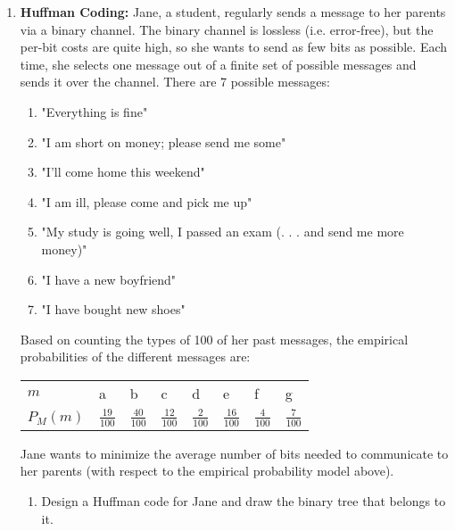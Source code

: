 \documentclass[pdftex,12pt,a4paper]{article}
\begin{document}
\begin{enumerate}
    \newpage
    \item \textbf{Huffman Coding:} Jane, a student, regularly sends a message
        to her parents via a binary channel. The binary channel is lossless
        (i.e.  error-free), but the per-bit costs are quite high, so she wants
        to send as few bits as possible. Each time, she selects one message out
        of a finite set of possible messages and sends it over the channel. 
        There are 7 possible messages:
        \begin{enumerate}
            \item "Everything is fine"
            \item "I am short on money; please send me some"
            \item "I'll come home this weekend"
            \item "I am ill, please come and pick me up"
            \item "My study is going well, I passed an exam (. . . and send me more money)"
            \item "I have a new boyfriend"
            \item "I have bought new shoes"
        \end{enumerate}
        Based on counting the types of 100 of her past messages, the empirical
        probabilities of the different messages are:
        \begin{table}[h]
        \centering
            \begin{tabular}{llllllll}
            $m$      & a                & b                & c                & d               & e                & f               & g               \\
            $P_M(m)$ & $\frac{19}{100}$ & $\frac{40}{100}$ & $\frac{12}{100}$ & $\frac{2}{100}$ & $\frac{16}{100}$ & $\frac{4}{100}$ & $\frac{7}{100}$
            \end{tabular}
        \end{table}

        Jane wants to minimize the average number of bits needed to communicate
        to her parents (with respect to the empirical probability model above).
        \begin{enumerate}
            \item Design a Huffman code for Jane and draw the binary tree that
                belongs to it.


\end{enumerate}
\end{enumerate}
\end{document}
